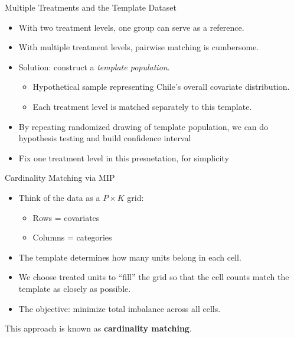 \documentclass{beamer}
\begin{document}
\begin{frame}{Multiple Treatments and the Template Dataset}

\begin{itemize}
    \item With two treatment levels, one group can serve as a reference.
    \item With multiple treatment levels, pairwise matching is cumbersome.
    
    \item Solution: construct a \textit{template population}.
    \begin{itemize}
        \item Hypothetical sample representing Chile’s overall covariate distribution.
        \item Each treatment level is matched separately to this template.
    \end{itemize}
    \item By repeating randomized drawing of template population, we can do hypothesis testing and build confidence interval
    \item Fix one treatment level in this presnetation, for simplicity
\end{itemize}

\end{frame}

\begin{frame}{Cardinality Matching via MIP}

\begin{itemize}
    \item Think of the data as a \(P \times K\) grid:
    \begin{itemize}
        \item Rows = covariates
        \item Columns = categories
    \end{itemize}
    
    \item The template determines how many units belong in each cell.
    
    \item We choose treated units to ``fill'' the grid so that
    the cell counts match the template as closely as possible.
    
    \item The objective: minimize total imbalance across all cells.
\end{itemize}



\medskip
This approach is known as \textbf{cardinality matching}.
\end{frame}
\end{document}
